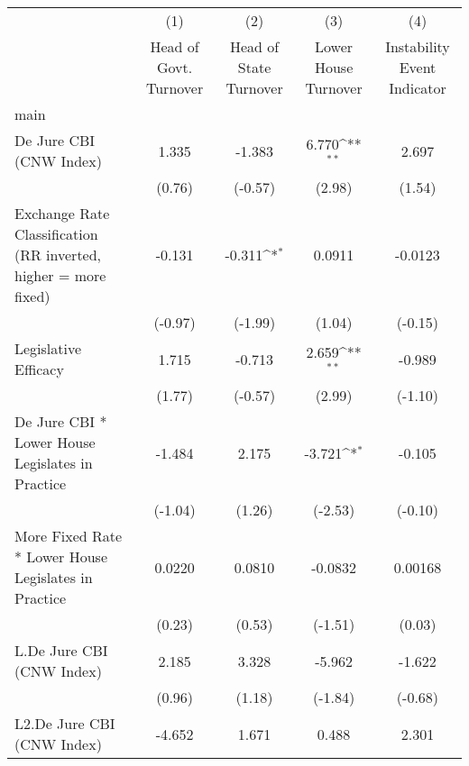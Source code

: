 {
\def\sym#1{\ifmmode^{#1}\else\(^{#1}\)\fi}
\begin{longtable}{l*{4}{c}}
\toprule\endfirsthead\midrule\endhead\midrule\endfoot\endlastfoot
                &\multicolumn{1}{c}{(1)}&\multicolumn{1}{c}{(2)}&\multicolumn{1}{c}{(3)}&\multicolumn{1}{c}{(4)}\\
                &\multicolumn{1}{c}{Head of Govt. Turnover}&\multicolumn{1}{c}{Head of State Turnover}&\multicolumn{1}{c}{Lower House Turnover}&\multicolumn{1}{c}{Instability Event Indicator}\\
\midrule
main            &                  &                  &                  &                  \\
De Jure CBI (CNW Index)&    1.335         &   -1.383         &    6.770\sym{**} &    2.697         \\
                &   (0.76)         &  (-0.57)         &   (2.98)         &   (1.54)         \\
\addlinespace
Exchange Rate Classification (RR inverted, higher = more fixed)&   -0.131         &   -0.311\sym{*}  &   0.0911         &  -0.0123         \\
                &  (-0.97)         &  (-1.99)         &   (1.04)         &  (-0.15)         \\
\addlinespace
Legislative Efficacy&    1.715         &   -0.713         &    2.659\sym{**} &   -0.989         \\
                &   (1.77)         &  (-0.57)         &   (2.99)         &  (-1.10)         \\
\addlinespace
De Jure CBI * Lower House Legislates in Practice&   -1.484         &    2.175         &   -3.721\sym{*}  &   -0.105         \\
                &  (-1.04)         &   (1.26)         &  (-2.53)         &  (-0.10)         \\
\addlinespace
More Fixed Rate * Lower House Legislates in Practice&   0.0220         &   0.0810         &  -0.0832         &  0.00168         \\
                &   (0.23)         &   (0.53)         &  (-1.51)         &   (0.03)         \\
\addlinespace
L.De Jure CBI (CNW Index)&    2.185         &    3.328         &   -5.962         &   -1.622         \\
                &   (0.96)         &   (1.18)         &  (-1.84)         &  (-0.68)         \\
\addlinespace
L2.De Jure CBI (CNW Index)&   -4.652         &    1.671         &    0.488         &    2.301         \\

\end{longtable}}
